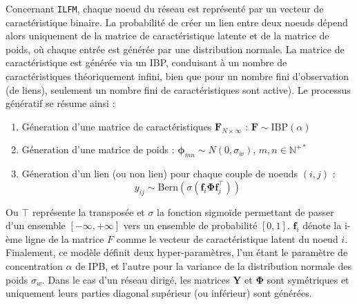 \documentclass[french]{hermes-journal}
\newcommand{\ilfm}{\texttt{ILFM}}
\newcommand{\IBP}{\mathrm{IBP}}
\newcommand{\mat}[1]{\bm{#1}}
\begin{document}
Concernant \ilfm, chaque noeud du réseau est représenté par un vecteur de caractéristique binaire. La probabilité de créer un lien entre deux noeuds dépend alors uniquement de la matrice de caractéristique latente et de la matrice  de poids, où chaque entrée est générée par une distribution normale. La matrice de caractéristique est générée via un IBP, conduisant à un nombre de caractéristiques théoriquement infini, bien que pour un nombre fini d'observation (de liens), seulement un nombre fini de caractéristiques sont active). Le processus génératif se résume ainsi :
\begin{enumerate}
\item Géneration d'une matrice de caractéristiques $\mat{F}_{N \times \infty}$ : $\mat{F} \sim \IBP(\alpha)$
\item Géneration d'une matrice de poids : $\mat{\phi}_{mn} \sim N(0, \sigma_w), \, m,n \in \mathbb{N}^{+*}$
\item Géneration d'un lien (ou non lien) pour chaque couple de noeuds $(i,j)$ : 
\begin{equation*}
y_{ij} \sim \mathrm{Bern}(\sigma(\mat{f}_{i} \mat{\Phi} \mat{f}_{j}^\top))
\label{eq:link-ilfm}
\end{equation*}
\end{enumerate}
%

Ou $\top$ représente la transposée et $\sigma$ la fonction sigmoïde permettant de passer d'un ensemble $[-\infty, +\infty]$ vers un ensemble de probabilité $[0,1]$.  $\mat{f}_{i}$ dénote la i-ème ligne de la matrice $F$ comme le vecteur de caractéristique latent du noeud $i$. Finalement, ce modèle définit deux hyper-paramètres, l'un étant le paramètre de concentration $\alpha$ de IPB, et l'autre pour la variance de la distribution normale des poids $\sigma_w$. Dans le cas d'un réseau dirigé, les matrices $\mat{Y}$ et $\mat{\Phi}$ sont symétriques et uniquement leurs parties diagonal supérieur (ou inférieur) sont générées. ~\\
\end{document}
